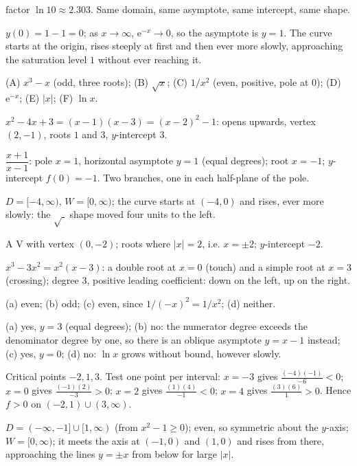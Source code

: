 \begin{solutions}
        factor $\ln 10\approx2.303$. Same domain, same asymptote, same
        intercept, same shape.
  \item $y(0)=1-1=0$; as $x\to\infty$, $\mathrm{e}^{-x}\to0$, so the
        asymptote is $y=1$. The curve starts at the origin, rises steeply
        at first and then ever more slowly, approaching the saturation
        level $1$ without ever reaching it.
  \item (A) $x^{3}-x$ \;(odd, three roots); \;(B) $\sqrt{x}$;
        \;(C) $1/x^{2}$ \;(even, positive, pole at $0$);
        \;(D) $\mathrm{e}^{-x}$; \;(E) $|x|$; \;(F) $\ln x$.
  \item $x^{2}-4x+3=(x-1)(x-3)=(x-2)^{2}-1$: opens upwards, vertex
        $(2,-1)$, roots $1$ and $3$, $y$-intercept $3$.
  \item $\dfrac{x+1}{x-1}$: pole $x=1$, horizontal asymptote $y=1$ (equal
        degrees); root $x=-1$; $y$-intercept $f(0)=-1$. Two branches, one
        in each half-plane of the pole.
  \item $D=[-4,\infty)$, $W=[0,\infty)$; the curve starts at $(-4,0)$ and
        rises, ever more slowly: the $\sqrt{\;}$ shape moved four units to
        the left.
  \item A V with vertex $(0,-2)$; roots where $|x|=2$, i.e. $x=\pm2$;
        $y$-intercept $-2$.
  \item $x^{3}-3x^{2}=x^{2}(x-3)$: a double root at $x=0$ (touch) and a
        simple root at $x=3$ (crossing); degree $3$, positive leading
        coefficient: down on the left, up on the right.
  \item (a) even; (b) odd; (c) even, since $1/(-x)^{2}=1/x^{2}$;
        (d) neither.
  \item (a) yes, $y=3$ (equal degrees); (b) no: the numerator degree
        exceeds the denominator degree by one, so there is an oblique
        asymptote $y=x-1$ instead; (c) yes, $y=0$; (d) no: $\ln x$ grows
        without bound, however slowly.
  \item Critical points $-2,1,3$. Test one point per interval:
        $x=-3$ gives $\frac{(-4)(-1)}{-6}<0$; $x=0$ gives
        $\frac{(-1)(2)}{-3}>0$; $x=2$ gives $\frac{(1)(4)}{-1}<0$;
        $x=4$ gives $\frac{(3)(6)}{1}>0$. Hence $f>0$ on
        $(-2,1)\cup(3,\infty)$.
  \item $D=(-\infty,-1]\cup[1,\infty)$ (from $x^{2}-1\ge0$); even, so
        symmetric about the $y$-axis; $W=[0,\infty)$; it meets the axis at
        $(-1,0)$ and $(1,0)$ and rises from there, approaching the lines
        $y=\pm x$ from below for large $|x|$.

\end{solutions}
